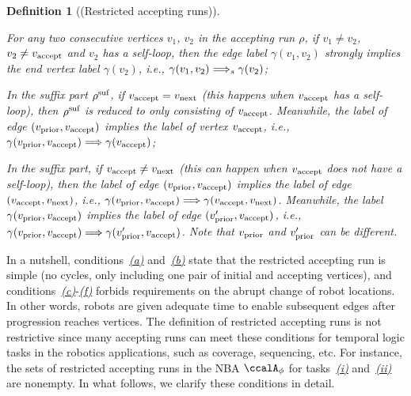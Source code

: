 \documentclass[Afour,sageh,times]{sagej}
\newtheorem{defn}[thm]{Definition}
\newcounter{listcounter}
\newenvironment{noindlist}
 {\begin{list}{(\alph{listcounter})~~}{\usecounter{listcounter} \labelsep=0em \labelwidth=0em \leftmargin=0em \itemindent=0em}}
 {\end{list}}
\newcommand{\autop}{\ccalA_{\phi}}
\newcommand{\vertex}[1]{v_{\textup{#1}}}
\newcommand{\simplies}{\DOTSB\Longrightarrow}
\begin{document}
\begin{defn}[(Restricted accepting runs)]
\begin{noindlist}
  \item  \label{cond:d} For any two consecutive vertices $v_1$, $v_2$ in the accepting run $\rho$, if $v_1 \neq v_2$, $v_2\neq \vertex{accept}$ and $v_2$ has a self-loop, then the edge label $\gamma(v_1, v_2)$  strongly implies  the end vertex label $\gamma(v_2)$, i.e., $\gamma(v_1, v_2) \simplies_s \gamma(v_2)$;
   \item \label{cond:e} In the suffix part $\rho^{\textup{suf}}$, if $\vertex{accept} = \vertex{next}$ (this happens when $\vertex{accept}$ has a self-loop), then $\rho^{\textup{suf}}$ is reduced to only consisting of  $\vertex{accept}$. Meanwhile, the label of edge $(\vertex{prior}, \vertex{accept})$  implies the label of vertex $\vertex{accept}$, i.e., $\gamma(\vertex{prior}, \vertex{accept}) \simplies  \gamma(\vertex{accept})$;
 \item \label{cond:f} In the suffix part, if $\vertex{accept} \neq \vertex{next}$ (this can happen when $\vertex{accept}$  does not have a self-loop), then the label of edge $(\vertex{prior}, \vertex{accept})$ implies the label of edge $(\vertex{accept}, \vertex{next})$, i.e., $\gamma(\vertex{prior}, \vertex{accept}) \simplies  \gamma(\vertex{accept}, \vertex{next})$. Meanwhile, the label $\gamma(\vertex{prior}, \vertex{accept})$ implies the label of  edge $(\vertex{prior}', \vertex{accept})$, i.e., $\gamma(\vertex{prior}, \vertex{accept}) \simplies  \gamma(\vertex{prior}', \vertex{accept})$. Note that $\vertex{prior}$ and $\vertex{prior}'$ can be different.
  \end{noindlist}
 \end{defn}

In a nutshell, conditions~\hyperref[cond:a]{\it (a)} and~\hyperref[cond:b]{\it (b)} state that the restricted accepting run is  simple (no cycles, only including one pair of initial and accepting vertices), and conditions~\hyperref[cond:c]{\it (c)}-\hyperref[cond:f]{\it (f)} forbids requirements on the abrupt change of robot locations. In other words, robots are given adequate time to enable subsequent edges after progression reaches vertices.
 The definition of restricted accepting runs is not restrictive since many accepting runs can meet these conditions for temporal logic tasks in the robotics applications, such as coverage, sequencing, etc. For instance, the sets of restricted accepting runs in the NBA $\autop$ for tasks~\hyperref[task:i]{\it (i)} and~\hyperref[task:ii]{\it (ii)} are nonempty. In what follows, we clarify these conditions in detail.
\end{document}
